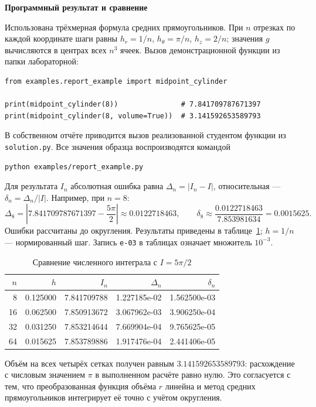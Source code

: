 \documentclass[12pt,a4paper]{article}
\newcommand{\taskhead}[1]{\par\textbf{#1}\par}
\begin{document}
\taskhead{Программный результат и сравнение}
Использована трёхмерная формула средних прямоугольников.
При $n$ отрезках по каждой координате шаги равны
$h_r=1/n$, $h_\theta=\pi/n$, $h_z=2/n$; значения $g$ вычисляются
в центрах всех $n^3$ ячеек.
Вызов демонстрационной функции из папки лабораторной:
\begin{lstlisting}[style=commands]
from examples.report_example import midpoint_cylinder

print(midpoint_cylinder(8))               # 7.841709787671397
print(midpoint_cylinder(8, volume=True))  # 3.141592653589793
\end{lstlisting}
В собственном отчёте приводится вызов реализованной студентом функции
из \texttt{solution.py}. Все значения образца воспроизводятся командой
\begin{lstlisting}[style=commands]
python examples/report_example.py
\end{lstlisting}
Для результата $I_n$ абсолютная ошибка равна $\Delta_n=|I_n-I|$,
относительная --- $\delta_n=\Delta_n/|I|$.
Например, при $n=8$:
\[
\Delta_8=\left|7.841709787671397-\frac{5\pi}{2}\right|
\approx0.0122718463,\qquad
\delta_8\approx\frac{0.0122718463}{7.853981634}=0.0015625.
\]
Ошибки рассчитаны до округления. Результаты приведены
в таблице~\ref{tab:integrals}; $h=1/n$ --- нормированный шаг.
Запись \texttt{e-03} в таблицах означает множитель $10^{-3}$.
\begin{table}[htbp]
\centering\small
\caption{Сравнение численного интеграла с $I=5\pi/2$}
\label{tab:integrals}
\begin{tabular}{|r|r|r|r|r|}\hline
$n$ & $h$ & $I_n$ & $\Delta_n$ & $\delta_n$\\\hline
8 & 0.125000 & 7.841709788 & 1.227185e-02 & 1.562500e-03 \\
16 & 0.062500 & 7.850913672 & 3.067962e-03 & 3.906250e-04 \\
32 & 0.031250 & 7.853214644 & 7.669904e-04 & 9.765625e-05 \\
64 & 0.015625 & 7.853789886 & 1.917476e-04 & 2.441406e-05 \\
\hline\end{tabular}
\end{table}
Объём на всех четырёх сетках получен равным $3.141592653589793$:
расхождение с числовым значением $\pi$ в выполненном расчёте равно нулю.
Это согласуется с тем, что преобразованная функция объёма $r$ линейна
и метод средних прямоугольников интегрирует её точно с учётом округления.
\end{document}
